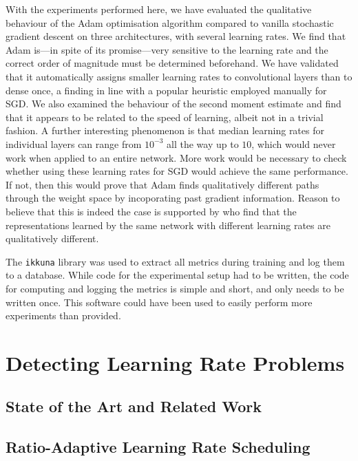With the experiments performed here, we have evaluated the qualitative behaviour
of the Adam optimisation algorithm compared to vanilla stochastic gradient
descent on three architectures, with several learning rates. We find that Adam
is---in spite of its promise---very sensitive to the learning rate and the
correct order of magnitude must be determined beforehand. We have validated that
it automatically assigns smaller learning rates to convolutional layers than to
dense once, a finding in line with a popular heuristic employed manually for
SGD. We also examined the behaviour of the second moment estimate and find that
it appears to be related to the speed of learning, albeit not in a trivial
fashion. A further interesting phenomenon is that median learning rates for
individual layers can range from $10^{-3}$ all the way up to $10$, which would
never work when applied to an entire network. More work would be necessary to
check whether using these learning rates for SGD would achieve the same
performance. If not, then this would prove that Adam finds qualitatively
different paths through the weight space by incoporating past gradient
information. Reason to believe that this is indeed the case is supported by
\citet{NIPS2018_7815} who find that the representations learned by the same
network with different learning rates are qualitatively different.

The \texttt{ikkuna} library was used to extract all metrics during training and
log them to a database. While code for the experimental setup had to be written,
the code for computing and logging the metrics is simple and short, and only
needs to be written once. This software could have been used to easily perform
more experiments than \citet{kingma2014adam} provided.

\section{Detecting Learning Rate Problems}%
\label{sec:detecting_learning_rate_problems}

\subsection{State of the Art and Related Work}%

\subsection{Ratio-Adaptive Learning Rate Scheduling}%
\label{sub:ratio_adaptive_learning_rate_scheduling}

